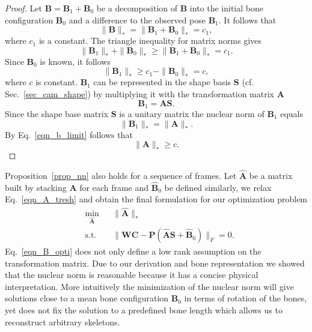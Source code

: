 \documentclass[10pt,letterpaper]{article}
\begin{document}
\begin{proof}
	Let $\bm{B}=\bm{B}_1+\bm{B}_0$ be a decomposition of $\bm{B}$ into the initial bone configuration $\bm{B}_0$ and a difference to the observed pose $\bm{B}_1$. It follows that 
	\begin{equation}
	\|\bm{B}\|_*=\|\bm{B}_1+\bm{B}_0\|_*=c_1
	,
	\end{equation}
	where $c_1$ is a constant.
	The triangle inequality for matrix norms gives
	\begin{equation}
	\label{eqn_B_min}
	\|\bm{B}_1\|_* +\|\bm{B}_0\|_* \geq \|\bm{B}_1+\bm{B}_0\|_*=c_1
	.
	\end{equation}
	Since $\bm{B}_0$ is known, it follows
	\begin{equation}
	\label{eqn_b_limit}
	\| \bm{B}_1 \|_* \geq c_1 - \| \bm{B}_0\|_* = c
	,
	\end{equation}
	where $c$ is constant. $\bm{B}_1$ can be represented in the shape basis $\bm{S}$ (cf. Sec.~\ref{sec_cam_shape}) by multiplying it with the transformation matrix $\bm{A}$
	\begin{equation}
	\bm{B}_1 = \bm{AS}
	.
	\end{equation}
	Since the shape base matrix $\bm{S}$ is a unitary matrix the nuclear norm of $\bm{B}_1$ equals
	\begin{equation}
	\|\bm{B}_1\|_* = \|\bm{A}\|_*
	.
	\end{equation}
	By Eq.~\eqref{eqn_b_limit} follows that
	\begin{equation}
	\label{eqn_A_tresh}
	\| \bm{A} \|_* \geq c
	.
	\end{equation}
\end{proof}
Proposition~\ref{prop_nn} also holds for a sequence of frames. Let $\bm{\hat{A}}$ be a matrix built by stacking $\bm{A}$ for each frame and $\bm{\hat{B}}_0$ be defined similarly, we relax Eq.~\eqref{eqn_A_tresh} and obtain the final formulation for our optimization problem
\begin{equation}
\label{eqn_B_opti}
\begin{aligned}
& \underset{\bm{\hat{A}}}{\min}
& & \|\bm{\hat{A}}\|_* \\
& \text{s.t.}
& & \| \bm{W} \bm{C}-\bm{P}(\bm{\hat{A}}\bm{S}+\bm{\hat{B}}_0) \|_F=0.
\end{aligned}
\end{equation}
Eq.~\eqref{eqn_B_opti} does not only define a low rank assumption on the transformation matrix. Due to our derivation and bone representation we showed that the nuclear norm is reasonable because it has a concise physical interpretation. More intuitively the minimization of the nuclear norm will give solutions close to a mean bone configuration $\bm{B}_0$ in terms of rotation of the bones, yet does not fix the solution to a predefined bone length which allows us to reconstruct arbitrary skeletons.
\end{document}
